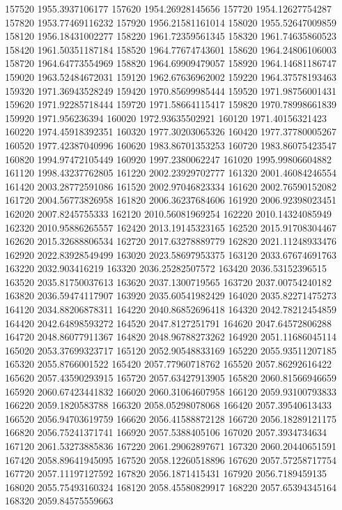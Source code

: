 {157520 1955.3937106177
157620 1954.26928145656
157720 1954.12627754287
157820 1953.77469116232
157920 1956.21581161014
158020 1955.52647009859
158120 1956.18431002277
158220 1961.72359561345
158320 1961.74635860523
158420 1961.50351187184
158520 1964.77674743601
158620 1964.24806106003
158720 1964.64773554969
158820 1964.69909479057
158920 1964.14681186747
159020 1963.52484672031
159120 1962.67636962002
159220 1964.37578193463
159320 1971.36943528249
159420 1970.85699985444
159520 1971.98756001431
159620 1971.92285718444
159720 1971.58664115417
159820 1970.78998661839
159920 1971.956236394
160020 1972.93635502921
160120 1971.40156321423
160220 1974.45918392351
160320 1977.30203065326
160420 1977.37780005267
160520 1977.42387040996
160620 1983.86701353253
160720 1983.86075423547
160820 1994.97472105449
160920 1997.2380062247
161020 1995.99806604882
161120 1998.43237762805
161220 2002.23929702777
161320 2001.46084246554
161420 2003.28772591086
161520 2002.97046823334
161620 2002.76590152082
161720 2004.56773826958
161820 2006.36237684606
161920 2006.92398023451
162020 2007.8245755333
162120 2010.56081969254
162220 2010.14324085949
162320 2010.95886265557
162420 2013.19145323165
162520 2015.91708304467
162620 2015.32688806534
162720 2017.63278889779
162820 2021.11248933476
162920 2022.83928549499
163020 2023.58697953375
163120 2033.67674691763
163220 2032.903416219
163320 2036.25282507572
163420 2036.53152396515
163520 2035.81750037613
163620 2037.1300719565
163720 2037.00754240182
163820 2036.59474117907
163920 2035.60541982429
164020 2035.82271475273
164120 2034.88206878311
164220 2040.86852696418
164320 2042.78212454859
164420 2042.64898593272
164520 2047.8127251791
164620 2047.64572806288
164720 2048.86077911367
164820 2048.96788273262
164920 2051.11686045114
165020 2053.37699323717
165120 2052.90548833169
165220 2055.93511207185
165320 2055.8766001522
165420 2057.77960718762
165520 2057.86292616422
165620 2057.43590293915
165720 2057.63427913905
165820 2060.81566946659
165920 2060.67423441832
166020 2060.31064607958
166120 2059.93100793833
166220 2059.1820583788
166320 2058.05298078068
166420 2057.39540613433
166520 2056.94703619759
166620 2056.41588872128
166720 2056.18289121175
166820 2056.75241371741
166920 2057.5388405106
167020 2057.3934734634
167120 2061.53273885836
167220 2061.29062897671
167320 2060.20440651591
167420 2058.89641945095
167520 2058.12260518896
167620 2057.57258717754
167720 2057.11197127592
167820 2056.1871415431
167920 2056.7189459135
168020 2055.75493160324
168120 2058.45580829917
168220 2057.65394345164
168320 2059.84575559663
}
